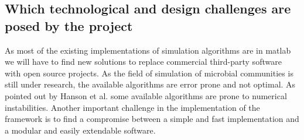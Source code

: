 \subsection*{Which technological and design challenges are posed by the project}

As most of the existing implementations of simulation algorithms are in matlab we will have to find new solutions to replace commercial
third-party software with open source projects. As the field of simulation of microbial communities is still under research, the available
algorithms are error prone and not optimal. As pointed out by Hanson et al. \cite{6915830} some available algorithms are prone to numerical 
instabilities. Another important challenge in the implementation of the framework is to find a compromise between a simple and fast
implementation and a modular and easily extendable software.

